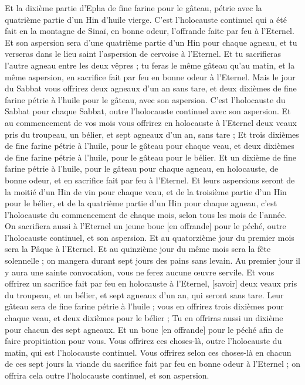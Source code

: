 \begin{multicols}{2}
Et la dixième partie d'Epha de fine farine pour le gâteau, pétrie avec la quatrième partie d'un Hin d'huile vierge.
C'est l'holocauste continuel qui a été fait en la montagne de Sinaï, en bonne odeur, l'offrande faite par feu à l'Eternel.
Et son aspersion sera d'une quatrième partie d'un Hin pour chaque agneau, et tu verseras dans le lieu saint l'aspersion de cervoise à l'Eternel.
Et tu sacrifieras l'autre agneau entre les deux vêpres ; tu feras le même gâteau qu'au matin, et la même aspersion, en sacrifice fait par feu en bonne odeur à l'Eternel.
Mais le jour du Sabbat vous offrirez deux agneaux d'un an sans tare, et deux dixièmes de fine farine pétrie à l'huile pour le gâteau, avec son aspersion.
C'est l'holocauste du Sabbat pour chaque Sabbat, outre l'holocauste continuel avec son aspersion.
Et au commencement de vos mois vous offrirez en holocauste à l'Eternel deux veaux pris du troupeau, un bélier, et sept agneaux d'un an, sans tare ;
Et trois dixièmes de fine farine pétrie à l'huile, pour le gâteau pour chaque veau, et deux dixièmes de fine farine pétrie à l'huile, pour le gâteau pour le bélier.
Et un dixième de fine farine pétrie à l'huile, pour le gâteau pour chaque agneau, en holocauste, de bonne odeur, et en sacrifice fait par feu à l'Eternel.
Et leurs aspersions seront de la moitié d'un Hin de vin pour chaque veau, et de la troisième partie d'un Hin pour le bélier, et de la quatrième partie d'un Hin pour chaque agneau, c'est l'holocauste du commencement de chaque mois, selon tous les mois de l'année.
On sacrifiera aussi à l'Eternel un jeune bouc [en offrande] pour le péché, outre l'holocauste continuel, et son aspersion.
Et au quatorzième jour du premier mois sera la Pâque à l'Eternel.
Et au quinzième jour du même mois sera la fête solennelle ; on mangera durant sept jours des pains sans levain.
Au premier jour il y aura une sainte convocation, vous ne ferez aucune œuvre servile.
Et vous offrirez un sacrifice fait par feu en holocauste à l'Eternel, [savoir] deux veaux pris du troupeau, et un bélier, et sept agneaux d'un an, qui seront sans tare.
Leur gâteau sera de fine farine pétrie à l'huile ; vous en offrirez trois dixièmes pour chaque veau, et deux dixièmes pour le bélier ;
Tu en offriras aussi un dixième pour chacun des sept agneaux.
Et un bouc [en offrande] pour le péché afin de faire propitiation pour vous.
Vous offrirez ces choses-là, outre l'holocauste du matin, qui est l'holocauste continuel.
Vous offrirez selon ces choses-là en chacun de ces sept jours la viande du sacrifice fait par feu en bonne odeur à l'Eternel ; on offrira cela outre l'holocauste continuel, et son aspersion.

\end{multicols}
